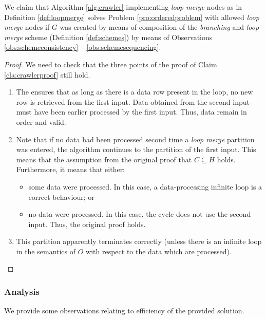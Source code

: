   We claim that Algorithm \ref{alg:crawler} implementing \emph{loop merge} nodes as in Definition \ref{def:loopmerge} solves Problem \ref{pro:orderedproblem} with allowed \emph{loop merge} nodes if $G$ was created by means of composition of the \emph{branching} and \emph{loop merge} scheme (Definition \ref{def:schemes}) by means of Observations \ref{obs:schemeconsistency} -- \ref{obs:schemesequencing}.
  \begin{proof}
    We need to check that the three points of the proof of Claim \ref{cla:crawlerproof} still hold.
    \begin{enumerate}
      \item The  ensures that as long as there is a data row present in the loop, no new row is retrieved from the first input. Data obtained from the second input must have been earlier processed by the first input. Thus, data remain in order and valid.
      \item Note that if no data had been processed second time a \emph{loop merge} partition was entered, the algorithm continues to the partition of the first input. This means that the assumption from the original proof that $C \subseteq H$ holds. Furthermore, it means that either:
       \begin{itemize}
         \item some data were processed. In this case, a data-processing infinite loop is a correct behaviour; or
         \item no data were processed. In this case, the cycle does not use the second input. Thus, the original proof holds.
       \end{itemize}
     \item This partition apparently terminates correctly (unless there is an infinite loop in the semantics of $O$ with respect to the data which are processed).
    \end{enumerate}
  \end{proof}
\myendclaim


\subsubsection{Analysis}
We provide some observations relating to efficiency of the provided solution.

